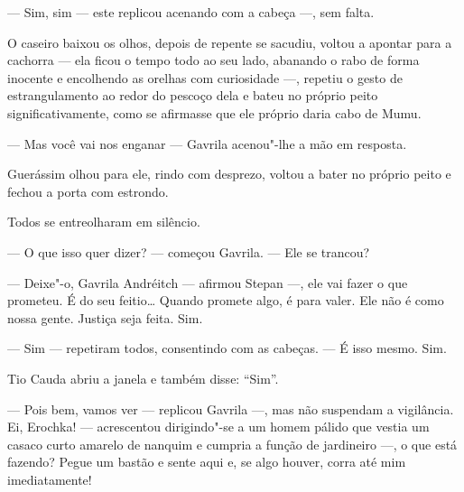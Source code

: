 --- Sim, sim --- este replicou acenando com a cabeça ---, sem falta.

O caseiro baixou os olhos, depois de repente se sacudiu, voltou a
apontar para a cachorra --- ela ficou o tempo todo ao seu lado, abanando o rabo
de forma inocente e encolhendo as orelhas com curiosidade ---, repetiu o
gesto de estrangulamento ao redor do pescoço dela e bateu no próprio
peito significativamente, como se afirmasse que ele próprio daria cabo
de Mumu.

--- Mas você vai nos enganar --- Gavrila acenou"-lhe a mão em resposta.

Guerássim olhou para ele, rindo com desprezo, voltou a bater no próprio
peito e fechou a porta com estrondo.

Todos se entreolharam em silêncio.

--- O que isso quer dizer? --- começou Gavrila. --- Ele se trancou?

--- Deixe"-o, Gavrila Andréitch --- afirmou Stepan ---, ele vai fazer o
que prometeu. É do seu feitio\ldots{} Quando promete algo, é para valer. Ele
não é como nossa gente. Justiça seja feita. Sim.

--- Sim --- repetiram todos, consentindo com as cabeças. --- É isso
mesmo. Sim.

Tio Cauda abriu a janela e também disse: ``Sim''.

--- Pois bem, vamos ver --- replicou Gavrila ---, mas não suspendam a
vigilância. Ei, Erochka! --- acrescentou dirigindo"-se a um homem pálido que vestia um casaco curto amarelo de nanquim e cumpria a função de
jardineiro ---, o que está fazendo? Pegue um bastão e sente aqui e, se
algo houver, corra até mim imediatamente!



